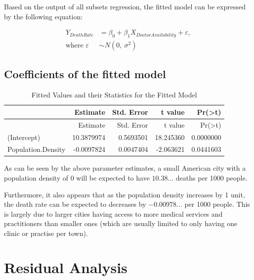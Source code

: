 \documentclass[12pt,]{article}
\begin{document}
Based on the output of all subsets regression, the fitted model can be
expressed by the following equation:

\[
\begin{aligned}
 Y_{Death Rate} &=  \beta_0 + \beta_1 X_{Doctor Availability}  +  \varepsilon,\\
\text{where }  \varepsilon &\sim N(0,\ \sigma^2)
\end{aligned}
\] \newpage

\subsection{Coefficients of the fitted
model}\label{coefficients-of-the-fitted-model}

\begin{longtable}[]{@{}lrrrr@{}}
\caption{Fitted Values and their Statistics for the Fitted
Model}\tabularnewline
\toprule
& Estimate & Std. Error & t value &
Pr(\textgreater{}\textbar{}t\textbar{})\tabularnewline
\midrule
\endfirsthead
\toprule
& Estimate & Std. Error & t value &
Pr(\textgreater{}\textbar{}t\textbar{})\tabularnewline
\midrule
\endhead
(Intercept) & 10.3879974 & 0.5693501 & 18.245360 &
0.0000000\tabularnewline
Population.Density & -0.0097824 & 0.0047404 & -2.063621 &
0.0441603\tabularnewline
\bottomrule
\end{longtable}

As can be seen by the above parameter estimates, a small American city
with a population density of 0 will be expected to have \(10.38...\)
deaths per 1000 people.

Furthermore, it also appears that as the population density increases by
1 unit, the death rate can be expected to decreases by \(-0.00978...\)
per 1000 people. This is largely due to larger cities having access to
more medical services and practitioners than smaller ones (which are
usually limited to only having one clinic or practise per town).

\section{Residual Analysis}\label{residual-analysis}
\end{document}

